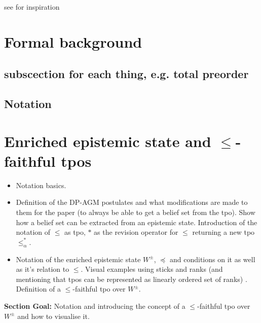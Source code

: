 \documentclass[11pt]{scrartcl}
\begin{document}
see \cite{Kai2020} for inspiration

\section{Formal background}
\subsection{subscection for each thing, e.g. total preorder}
\subsection{Notation}

%

%
%

\section{Enriched epistemic state and $\leq$-faithful tpos}
\begin{itemize}
    \item Notation basics.
    \item Definition of the DP-AGM postulates and what modifications are made to them for the paper (to always be able to get a belief set from the tpo). Show how a belief set can be extracted from an epistemic state. Introduction of the notation of $\leq$ as tpo, $\ast$ as the revision operator for $\leq$ returning a new tpo $\leq^{\ast}_{\alpha}$. 
    \item Notation of the enriched epistemic state $W^{\pm}$, $\preceq$ and conditions on it as well as it's relation to $\leq$. Visual examples using sticks \cite{Booth2011} and ranks (and mentioning that tpos can be represented as linearly ordered set of ranks) \cite{Booth2006}. Definition of a $\leq$-faithful tpo over $W^{\pm}$.
\end{itemize}
\textbf{Section Goal:} Notation and introducing the concept of a $\leq$-faithful tpo over $W^{\pm}$ and how to visualise it.

\end{document}
